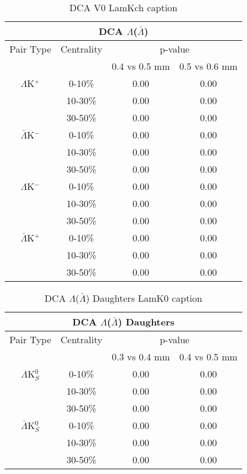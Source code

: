\begin{table}
 \centering
 \begin{tabular}{|c|c|c|c|}
 \multicolumn{4}{c}{DCA $\Lambda$($\bar{\Lambda}$)} \\
  \hline
  Pair Type & Centrality & \multicolumn{2}{c|}{p-value} \\
  \cline{3-4}
   & & 0.4 vs 0.5 mm & 0.5 vs 0.6 mm \\
  \hline
  $\Lambda$K$^{+}$ & 0-10\% & 0.00 & 0.00 \\
   & 10-30\% & 0.00 & 0.00 \\
   & 30-50\% & 0.00 & 0.00 \\
  \hline
  $\bar{\Lambda}$K$^{-}$ & 0-10\% & 0.00 & 0.00 \\
   & 10-30\% & 0.00 & 0.00 \\
   & 30-50\% & 0.00 & 0.00 \\
  \hline \hline
  $\Lambda$K$^{-}$ & 0-10\% & 0.00 & 0.00 \\
   & 10-30\% & 0.00 & 0.00 \\
   & 30-50\% & 0.00 & 0.00 \\
  \hline
  $\bar{\Lambda}$K$^{+}$ & 0-10\% & 0.00 & 0.00 \\
   & 10-30\% & 0.00 & 0.00 \\
   & 30-50\% & 0.00 & 0.00 \\
  \hline
 \end{tabular}
 \caption{DCA V0 LamKch caption}
 \label{tab:V0DcaLamKch}
\end{table}


\begin{table}
 \centering
 \begin{tabular}{|c|c|c|c|}
 \multicolumn{4}{c}{DCA $\Lambda$($\bar{\Lambda}$) Daughters} \\
  \hline
  Pair Type & Centrality & \multicolumn{2}{c|}{p-value} \\
  \cline{3-4}
   & & 0.3 vs 0.4 mm & 0.4 vs 0.5 mm \\
  \hline
  $\Lambda$K$^{0}_{S}$ & 0-10\% & 0.00 & 0.00 \\
   & 10-30\% & 0.00 & 0.00 \\
   & 30-50\% & 0.00 &0.00 \\
  \hline
  $\bar{\Lambda}$K$^{0}_{S}$ & 0-10\% & 0.00 & 0.00 \\
   & 10-30\% & 0.00 & 0.00 \\
   & 30-50\% & 0.00 & 0.00 \\
  \hline
 \end{tabular}
 \caption{DCA $\Lambda$($\bar{\Lambda}$) Daughters LamK0 caption}
 \label{tab:LamDaughtersDcaLamK0}
\end{table}

